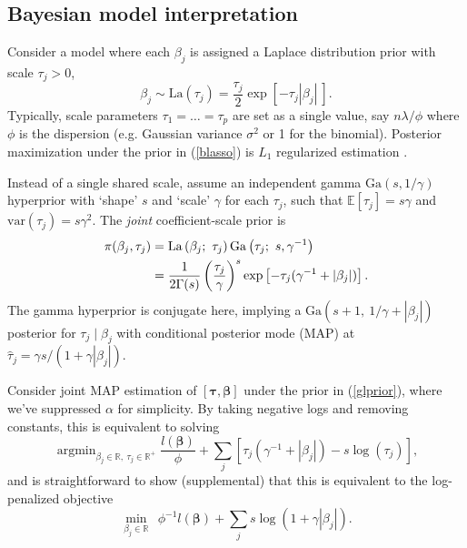 \documentclass[12pt]{article}
\newcommand{\bs}[1]{\boldsymbol{#1}}
\newcommand{\mr}[1]{\mathrm{#1}}
\newcommand{\ds}[1]{\mathds{#1}}
\DeclareMathOperator*{\argmin}{argmin}
\begin{document}
\subsection{Bayesian model interpretation}

Consider a model where each $\beta_j$ is
assigned a Laplace distribution prior with scale $\tau_j>0$,
\begin{equation}\label{blasso}
\beta_j \sim \mr{La}\left(\tau_j\right) =
\frac{\tau_j}{2}\exp\left[ -\tau_j|\beta_j| ~\right].
\end{equation}
Typically, scale parameters $\tau_1 =
\ldots = \tau_p$ are set as a single value, say $n\lambda/\phi$ where
 $\phi$ is the dispersion (e.g. Gaussian variance
$\sigma^2$ or 1 for the binomial).   Posterior
maximization under the prior in (\ref{blasso}) is $L_1$ regularized estimation \citep[e.g.,][]{park_bayesian_2008}.

Instead of a single shared scale, assume an independent gamma
$\mr{Ga}(s,1/\gamma)$ hyperprior with `shape' $s$ and `scale' $\gamma$ for
each $\tau_j$, such that $\ds{E}[\tau_j] = s\gamma$ and $\mr{var}(\tau_j) =
s\gamma^2$.  The {\it joint} coefficient-scale prior is
\begin{align}\label{glprior}
\pi(\beta_j,\tau_j) &= \mr{La}\left(\beta_j ;~ \tau_j\right)
\mr{Ga}\left(\tau_j;~ s,\gamma^{-1}\right) \\&= \frac{ 1}{2\Gamma({s})} 
\left(\frac{\tau_j}{\gamma}\right)^{s}
               \exp\left[-\tau_j(\gamma^{-1}+|\beta_j|)\right].\notag
\end{align}
The gamma hyperprior is conjugate here, implying a $\mr{Ga}\left(s+1, ~1/\gamma +
|\beta_j|\right)$ posterior for $\tau_j \mid \beta_j$ with conditional
posterior mode (MAP) at $\hat\tau_j = \gamma s/(1 + \gamma |\beta_j|)$.

Consider joint MAP estimation of $[\bs{\tau},\bs{\beta}]$ under the prior in
   (\ref{glprior}), where we've suppressed $\alpha$ for simplicity. By taking
   negative logs and removing constants, this is equivalent to solving
\begin{equation}\label{gljoint}
\argmin_{\beta_j\in\ds{R},~\tau_j \in \ds{R}^{+}}\!\!
\frac{l(\bs{\beta})}{\phi} + \sum_j \left[\tau_j(\gamma^{-1}+|\beta_j|) - s\log(\tau_j)\right],
\end{equation}
and is straightforward to show (supplemental) that this is equivalent 
to the log-penalized objective 
\begin{equation}\label{logobj}
\min_{\beta_j\in\ds{R}}~~
\phi^{-1}l(\bs{\beta}) + \sum_j  s\log(1+\gamma|\beta_j|).
\end{equation}
\end{document}
